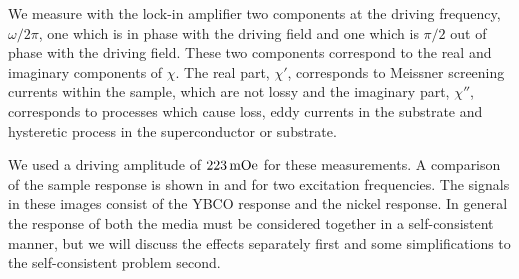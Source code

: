 We measure with the lock-in amplifier two components at the driving
frequency, $\omega/2 \pi$, one which is in phase with the driving 
field and one which is $\pi/2$ out of phase with the driving field.
These two components correspond to the real and imaginary 
components of $\chi$. 
The real part, $\chi'$,  corresponds to 
Meissner screening currents within the sample, which are not lossy and 
the imaginary part, $\chi''$, corresponds to processes which cause loss, 
eddy currents in the substrate and hysteretic process in the superconductor
or substrate. 

We used a driving amplitude of $223\,\mathrm{mOe}$ for these
measurements. A comparison of the sample response
is shown in  and 
 for two excitation
frequencies. 
The signals in these images consist of the YBCO
response and the nickel response. In general the response of both
the media must be considered together in a self-consistent manner, 
but we will discuss the effects separately first and some simplifications
to the self-consistent problem second. 


